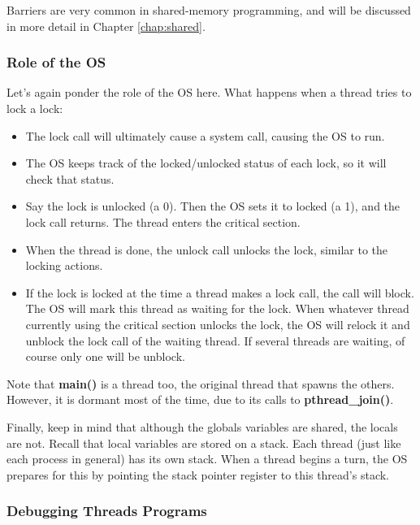 Barriers are very common in shared-memory programming, and will be
discussed in more detail in Chapter \ref{chap:shared}.

\subsubsection{Role of the OS}

Let's again ponder the role of the OS here.  What happens when a thread
tries to lock a lock:

\begin{itemize}

\item The lock call will ultimately cause a system call, causing the OS
to run.

\item The OS keeps track of the locked/unlocked status of each lock, so
it will check that status.

\item Say the lock is unlocked (a 0).  Then  the OS sets it to locked (a
1), and the lock call returns.  The thread enters the critical section.

\item When the thread is done, the unlock call unlocks the lock, similar
to the locking actions.

\item If the lock is locked at the time a thread makes a lock call, the
call will block.  The OS will mark this thread as waiting for the lock.
When whatever thread currently using the critical section unlocks the
lock, the OS will relock it and unblock the lock call of the waiting
thread.  If several threads are waiting, of course only one will be
unblock.

\end{itemize}

Note that {\bf main()} is a thread too, the original thread that spawns
the others.  However, it is dormant most of the time, due to its calls
to {\bf pthread\_join()}.

Finally, keep in mind that although the globals variables are shared,
the locals are not.  Recall that local variables are stored on a stack.
Each thread (just like each process in general) has its own stack.  When
a thread begins a turn, the OS prepares for this by pointing the stack
pointer register to this thread's stack.

\subsubsection{Debugging Threads Programs}
\label{debugthreads}

